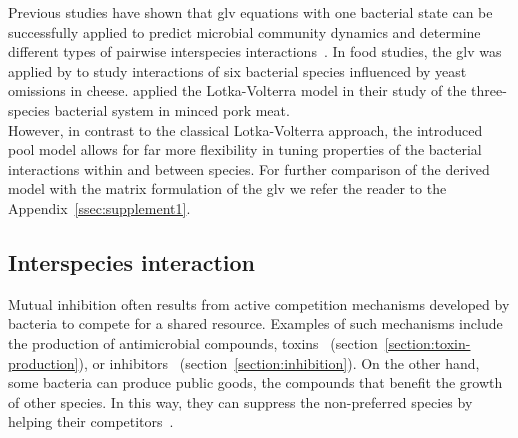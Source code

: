 \documentclass[10pt,1p,authoryear]{elsarticle}
\numberwithin{equation}{section}
\begin{document}
Previous studies have shown that \ac{glv} equations with one bacterial state can be successfully applied to predict microbial community dynamics and determine different types of pairwise interspecies interactions~\citep{dedrick_when_2023, stein_ecological_2013, venturelli_deciphering_2018, hoffmann_power_2007}.
In food studies, the \ac{glv} was applied by \citet{mounier_microbial_2008} to study interactions of six bacterial species influenced by yeast omissions in cheese.
\citet{cauchie_modeling_2020} applied the Lotka-Volterra model in their study of the three-species bacterial system in minced pork meat.\\
%
However, in contrast to the classical Lotka-Volterra approach, the introduced pool model allows for far more flexibility in tuning properties of the bacterial interactions within and between species.
For further comparison of the derived model with the matrix formulation of the \ac{glv} we refer the reader to the Appendix~\ref{ssec:supplement1}.
%
%
\subsection{Interspecies interaction}
Mutual inhibition often results from active competition mechanisms developed by bacteria to compete for a shared resource.
Examples of such mechanisms include the production of antimicrobial compounds, toxins~\citep{wloch-salamon_effect_2008, chao_structured_1981} (section~\ref{section:toxin-production}), or inhibitors~\citep{lenski_coexistence_1986} (section~\ref{section:inhibition}).
On the other hand, some bacteria can produce public goods, the compounds that benefit the growth of other species.
In this way, they can suppress the non-preferred species by helping their competitors~\citep{hibbing_bacterial_2010}.
%
\end{document}

